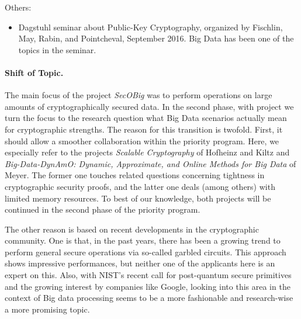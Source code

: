 \vspace*{-0.3cm}
\noindent
Others:
\vspace*{-0.3cm}
\begin{itemize}
\item Dagstuhl seminar about Public-Key Cryptography, organized by Fischlin, May, Rabin, and Pointcheval, September 2016. Big Data has been one of the topics in the seminar.
\end{itemize}


\paragraph{Shift of Topic.}
The main focus of the project \emph{SecOBig} was to perform operations on large amounts of cryptographically secured data. In the second phase, with project \emph{\memoc} we turn the focus to the research question what Big Data scenarios actually mean for cryptographic strengths. The reason for this transition is twofold. First, it should allow a smoother collaboration within the priority program. Here, we especially refer to the projects \emph{Scalable Cryptography} of Hofheinz and Kiltz and \emph{Big-Data-DynAmO: Dynamic, Approximate, and Online Methods for Big Data} of Meyer. The former one touches related questions concerning tightness in cryptographic security proofs, and the latter one deals (among others) with limited memory resources. To best of our knowledge, both projects will be continued in the second phase of the priority program.

The other reason is based on recent developments in the cryptographic community. One is that, in the past years, there has been a growing trend to perform general secure operations via so-called garbled circuits. This approach shows impressive performances, but neither one of the applicants here is an expert on this. Also, with NIST's recent call for post-quantum secure primitives and the growing interest by companies like Google, looking into this area in the context of Big data processing seems to be a more fashionable and research-wise a more promising topic.


